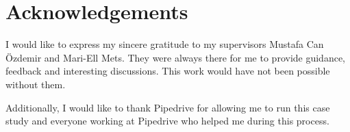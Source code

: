 \documentclass{master_thesis}
\begin{document}
\section*{Acknowledgements}
\thispagestyle{empty}

I would like to express my sincere gratitude to my supervisors Mustafa Can Özdemir
and Mari-Ell Mets. They were always there for me to provide guidance, feedback and interesting discussions. This work would have not been possible without them.

Additionally, I would like to thank Pipedrive for allowing me to run this case study and everyone working at Pipedrive who helped me during this process.
\end{document}
